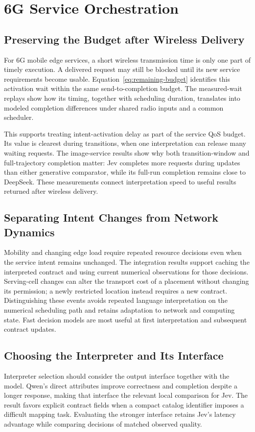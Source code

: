 \section{6G Service Orchestration}
\subsection{Preserving the Budget after Wireless Delivery}
For 6G mobile edge services, a short wireless transmission time is only one part of timely execution. A delivered request may still be blocked until its new service requirements become usable. Equation~\eqref{eq:remaining-budget} identifies this activation wait within the same send-to-completion budget. The measured-wait replays show how its timing, together with scheduling duration, translates into modeled completion differences under shared radio inputs and a common scheduler.

This supports treating intent-activation delay as part of the service QoS budget. Its value is clearest during transitions, when one interpretation can release many waiting requests. The image-service results show why both transition-window and full-trajectory completion matter: Jev completes more requests during updates than either generative comparator, while its full-run completion remains close to DeepSeek. These measurements connect interpretation speed to useful results returned after wireless delivery.

\subsection{Separating Intent Changes from Network Dynamics}
Mobility and changing edge load require repeated resource decisions even when the service intent remains unchanged. The integration results support caching the interpreted contract and using current numerical observations for those decisions. Serving-cell changes can alter the transport cost of a placement without changing its permission; a newly restricted location instead requires a new contract. Distinguishing these events avoids repeated language interpretation on the numerical scheduling path and retains adaptation to network and computing state. Fast decision models are most useful at first interpretation and subsequent contract updates.

\subsection{Choosing the Interpreter and Its Interface}
Interpreter selection should consider the output interface together with the model. Qwen's direct attributes improve correctness and completion despite a longer response, making that interface the relevant local comparison for Jev. The result favors explicit contract fields when a compact catalog identifier imposes a difficult mapping task. Evaluating the stronger interface retains Jev's latency advantage while comparing decisions of matched observed quality.

